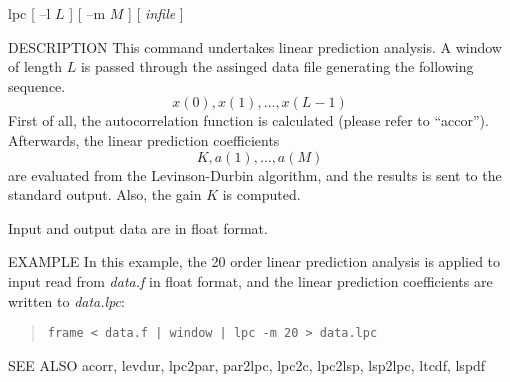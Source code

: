 
\begin{synopsis}
\item [lpc] [ --l $L$ ] [ --m $M$ ] [ {\em infile} ] 
\end{synopsis}

\begin{qsection}{DESCRIPTION}
This command undertakes linear prediction analysis.
A window of length $L$ is passed through the assinged
data file generating the following sequence.
\begin{displaymath}
  x(0),x(1),\ldots,x(L-1)
\end{displaymath}
First of all, the autocorrelation function is
calculated (please refer to ``accor'').
Afterwards, the linear prediction coefficients
\begin{displaymath}
  K, a(1), \ldots, a(M)
\end{displaymath}
are evaluated from the Levinson-Durbin algorithm,
and the results is sent to the standard output.
Also, the gain $K$ is computed.
\par
Input and output data are in float format.
\end{qsection}

\begin{options}
\end{options}

\begin{qsection}{EXAMPLE}
In this example, the 20 order linear prediction analysis is applied
to input read from {\em data.f} in float format,
and the linear prediction coefficients are written to
{\em data.lpc}:
\begin{quote}
 \verb!frame < data.f | window | lpc -m 20 > data.lpc!
\end{quote} 
\end{qsection}

\begin{qsection}{SEE ALSO}
 acorr, levdur, lpc2par, par2lpc, lpc2c, lpc2lsp, lsp2lpc, 
 ltcdf, lspdf
\end{qsection}
